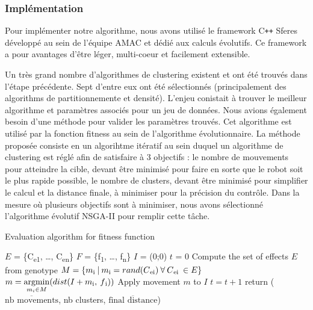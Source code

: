 \documentclass{llncs}
\newcommand{\textoverline}[1]{$\overline{\mbox{#1}}$}
\newcommand*\circled[1]{\tikz[baseline=(char.base)]{
            \node[shape=circle,draw,inner sep=2pt] (char) {#1};}}
\begin{document}
\subsubsection{Implémentation}
Pour implémenter notre algorithme, nous avons utilisé le framework C{}\verb!++! Sferes \cite{Mouret2010} développé au sein de l'équipe AMAC et dédié aux calculs évolutifs. Ce framework a pour avantages d'être léger, multi-coeur et facilement extensible. 

Un très grand nombre d'algorithmes de clustering existent et ont été trouvés dans l'étape précédente. Sept d'entre eux ont été sélectionnés (principalement des algorithms de partitionnemente et densité). L'enjeu conistait à trouver le meilleur algorithme et paramètres associés pour un jeu de données. Nous avions également besoin d'une méthode pour valider les paramètres trouvés. Cet algorithme est utilisé par la fonction fitness au sein de l'algorithme évolutionnaire. La méthode proposée consiste en un algorihtme itératif au sein duquel un algorithme de clustering est réglé afin de satisfaire à 3 objectifs : \circled{1} le nombre de mouvements pour atteindre la cible, devant être minimisé pour faire en sorte que le robot soit le plus rapide possible, \circled{2} le nombre de clusters, devant être minimisé pour simplifier le calcul et \circled{3} la distance finale, à minimiser pour la précision du contrôle. Dans la mesure où plusieurs objectifs sont à minimiser, nous avons sélectionné l'algorithme évolutif NSGA-II\cite{Deb:2002:FEM:2221359.2221582} pour remplir cette tâche.

\begin{algorithm}
\caption{Evaluation algorithm for fitness function}\label{euclid}
  \begin{algorithmic}[1]
    \State $E$ = \{C\textsubscript{e1}, \dots, C\textsubscript{en}\} 
    \State $F$ = \{f\textsubscript{1}, \dots, f\textsubscript{n}\} 
    \State $I$ = (0;0) 
    \State $t$ = 0 
    \State Compute the set of effects $E$ from genotype
            \State $M = \{ m\textsubscript{i}\:|\:m\textsubscript{i} = rand(C\textsubscript{ei})\:\forall\:C\textsubscript{ei}\:\in E\}$
            \State $m = \operatornamewithlimits{argmin}\limits_{m_i \in M}(dist(I+m\textsubscript{i},\:f\textsubscript{i}))$
            \State Apply movement $m$ to $I$
            \State $t = t + 1$
          \EndWhile
        \EndFor
      \EndFor
      \State return (\textoverline{nb movements}, nb clusters, \textoverline{final distance})
  \end{algorithmic}
\end{algorithm}
\end{document}
